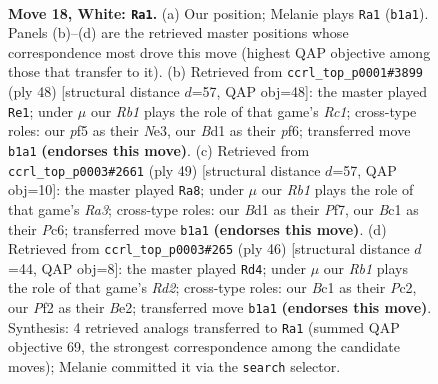 \documentclass[11pt]{article}
\begin{document}
\clearpage

\begin{figure}[p]\centering
\begin{subfigure}{0.46\textwidth}\centering
\resizebox{\linewidth}{!}{%
\newchessgame
\chessboard[
  setfen={rnb3k1/1p6/6p1/p1p2p2/2P4p/2P5/P4PPP/1RBB2K1 w - - 0 18},
  showmover=false,
  pgfstyle=straightmove, color=movearrow, markmove={b1-a1}
]}
\caption{}
\end{subfigure}\hfill
\begin{subfigure}{0.46\textwidth}\centering
\resizebox{\linewidth}{!}{%
\newchessgame
\chessboard[
  setfen={2r5/1bp3pp/p3kp2/7P/Pp6/1P2N3/1P3PP1/2R3K1 w - - 1 25},
  showmover=false,
  pgfstyle=straightmove, color=movearrow, markmove={c1-e1}
]}
\caption{}
\end{subfigure}
\\[4pt]
\begin{subfigure}{0.46\textwidth}\centering
\resizebox{\linewidth}{!}{%
\newchessgame
\chessboard[
  setfen={8/1pk2pp1/r1pp4/5b1p/PpPP4/1P4PP/4KPB1/2R5 b - - 3 25},
  showmover=false,
  pgfstyle=straightmove, color=movearrow, markmove={a6-a8}
]}
\caption{}
\end{subfigure}\hfill
\begin{subfigure}{0.46\textwidth}\centering
\resizebox{\linewidth}{!}{%
\newchessgame
\chessboard[
  setfen={4r1k1/1p1n1pp1/2p1b2p/8/p4B1P/P7/1PPRBPP1/6K1 w - - 7 24},
  showmover=false,
  pgfstyle=straightmove, color=movearrow, markmove={d2-d4}
]}
\caption{}
\end{subfigure}
\caption{\textbf{Move 18, White: \texttt{Ra1}.} (a) Our position; Melanie plays \texttt{Ra1} (\texttt{b1a1}). Panels (b)--(d) are the retrieved master positions whose correspondence most drove this move (highest QAP objective among those that transfer to it). (b) Retrieved from \texttt{ccrl\_top\_p0001\#3899} (ply 48) [structural distance $d$=57, QAP obj=48]: the master played \texttt{Re1}; under $\mu$ our \emph{Rb1} plays the role of that game's \emph{Rc1}; cross-type roles: our \emph{p}f5 as their \emph{N}e3, our \emph{B}d1 as their \emph{p}f6; transferred move \texttt{b1a1} \textbf{(endorses this move)}. (c) Retrieved from \texttt{ccrl\_top\_p0003\#2661} (ply 49) [structural distance $d$=57, QAP obj=10]: the master played \texttt{Ra8}; under $\mu$ our \emph{Rb1} plays the role of that game's \emph{Ra3}; cross-type roles: our \emph{B}d1 as their \emph{P}f7, our \emph{B}c1 as their \emph{P}c6; transferred move \texttt{b1a1} \textbf{(endorses this move)}. (d) Retrieved from \texttt{ccrl\_top\_p0003\#265} (ply 46) [structural distance $d$=44, QAP obj=8]: the master played \texttt{Rd4}; under $\mu$ our \emph{Rb1} plays the role of that game's \emph{Rd2}; cross-type roles: our \emph{B}c1 as their \emph{P}c2, our \emph{P}f2 as their \emph{B}e2; transferred move \texttt{b1a1} \textbf{(endorses this move)}. Synthesis: 4 retrieved analogs transferred to \texttt{Ra1} (summed QAP objective 69, the strongest correspondence among the candidate moves); Melanie committed it via the \texttt{search} selector.}
\label{fig:thought-m34}
\end{figure}
\end{document}
